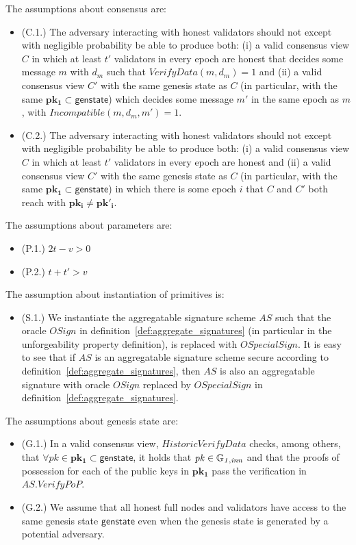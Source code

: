 \noindent The assumptions about consensus are:
\begin{itemize}
\item (C.1.) The adversary interacting with honest validators should not except with negligible probability be able to produce both:
(i) a valid consensus view $C$ in which at least $t'$ validators in every epoch are honest that decides some message $m$ 
with $d_m$ such that $\mathit{VerifyData}(m, d_m) =1$ and 
(ii) a valid consensus view $C'$ with the same genesis state as $C$ (in particular, with the same $\mathbf{pk_1} \subset \mathsf{genstate}$) 
which decides some message $m'$ in the same epoch as $m$, with $\mathit{Incompatible}(m, d_m, m') = 1$. 
\item (C.2.) The adversary interacting with honest validators should not except with negligible probability be able to produce both:
(i) a valid consensus view $C$ in which at least $t'$ validators in every epoch are honest and 
(ii)  a valid consensus view $C'$ with the same genesis state as $C$ (in particular, with the same $\mathbf{pk_1} \subset \mathsf{genstate}$) 
in which there is some epoch $i$ that $C$ and $C'$ both reach with $\mathbf{pk_i} \neq \mathbf{pk'_i}$.
\end{itemize}

\noindent The assumptions about parameters are:
\begin{itemize}
\item (P.1.) $2t -v > 0$
\item (P.2.) $t + t' > v$
\end{itemize}

\noindent The assumption about instantiation of primitives is:
\begin{itemize}
\item (S.1.) We instantiate the aggregatable signature scheme $\mathit{AS}$ 
such that the oracle $\mathit{OSign}$ in definition~\ref{def:aggregate_signatures} (in particular in the 
unforgeability property definition), is replaced with $\mathit{OSpecialSign}$. It is easy to see that if $\mathit{AS}$ 
is an aggregatable signature scheme secure according to definition~\ref{def:aggregate_signatures},  
then $\mathit{AS}$ is also an aggregatable signature with oracle $\mathit{OSign}$ replaced by 
$\mathit{OSpecialSign}$ in definition~\ref{def:aggregate_signatures}.
\end{itemize}

\noindent The assumptions about genesis state are:
\begin{itemize}
\item (G.1.) In a valid consensus view, $\mathit{HistoricVerifyData}$ checks, among others, that 
$\forall \mathit{pk} \in \mathbf{pk_1} \subset \mathsf{genstate}$, it holds that $\mathit{pk} \in \mathbb{G}_{\mathit{1,inn}}$ 
and that the proofs of possession for each of the public keys in $ \mathbf{pk_1}$ pass the verification in $\mathit{AS.VerifyPoP}$.
\item  (G.2.) We assume that all honest full nodes and validators have access to the same genesis state 
$\mathsf{genstate}$ even when the genesis state is generated by a potential adversary.
\end{itemize}

